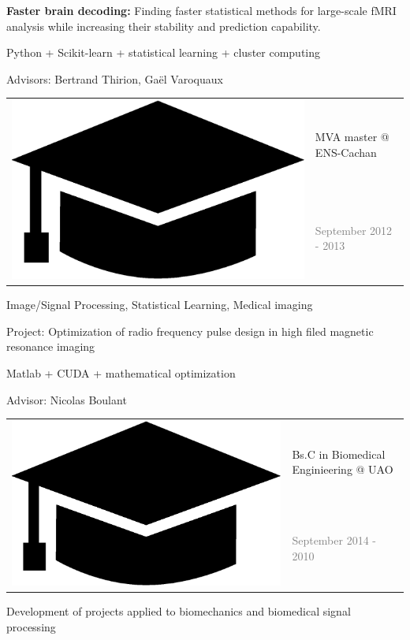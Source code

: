 \documentclass[letterpaper]{article}
\begin{document}
\begin{minipage}{1.\linewidth}
\begin{minipage}{0.47\linewidth}
\begin{minipage}{1\linewidth}
		{\small\textbf{Faster brain decoding:} Finding faster statistical 
		methods for large-scale fMRI analysis while increasing their stability 
		and prediction capability.
	
		Python + Scikit-learn + statistical learning + cluster computing
		
		\textmd{Advisors:} Bertrand Thirion, Ga{\"e}l Varoquaux}
	\end{minipage} %
	\begin{minipage}{1\linewidth} %
		\vspace{2ex}
		\begin{tabularx}{1\textwidth}{rX}				
			\multirow{2}{*}{\includegraphics[trim= 0.1cm 0.1cm 0.1cm 0.1cm, 
			clip=true, width=0.12\linewidth]{hat.eps}} & 
			{\large MVA master @ ENS-Cachan }\\
			& {\small\textcolor{gray}{September 2012 - 2013}}\\
		\end{tabularx}
		\vspace{0.1cm}
		
		{\small Image/Signal Processing, Statistical Learning, Medical imaging
		
		\textmd{Project:} Optimization of radio frequency pulse design in high 
		filed magnetic resonance imaging
		
		Matlab + CUDA + mathematical optimization
		
		\textmd{Advisor:} Nicolas Boulant}
	\end{minipage} %
	\begin{minipage}{1\linewidth} %
		\vspace{2ex}
		\begin{tabularx}{1\textwidth}{rX}				
			\multirow{2}{*}{\includegraphics[trim= 0.1cm 0.1cm 0.1cm 0.1cm,	
			clip=true, width=0.12\linewidth]{hat.eps}} & {\large Bs.C in 
			Biomedical Enginieering @ UAO}\\
			& {\small\textcolor{gray}{September 2014 - 2010}}\\
		\end{tabularx}
		\vspace{0.1cm}
		
		{\small Development of projects applied to biomechanics and biomedical 
		signal processing
		
}
\end{minipage}
\end{minipage}
\end{minipage}
\end{document}
